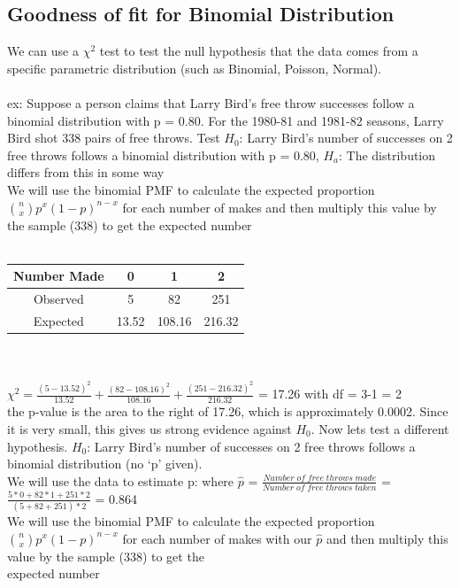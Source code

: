 \documentclass[12pt, a4paper]{article}
\begin{document}
	\subsection{Goodness of fit for Binomial Distribution}
	We can use a $\chi^2$ test to test the null hypothesis that the data comes from a specific parametric distribution (such as Binomial, Poisson, Normal). \\~\\
	ex: Suppose a person claims that Larry Bird's free throw successes follow a binomial distribution with p = 0.80. For the 1980-81 and 1981-82 seasons, Larry Bird shot 338 pairs of free throws. Test $H_0$: Larry Bird's number of successes on 2 free throws follows a binomial distribution with p = 0.80, $H_a$: The distribution differs from this in some way \\
	We will use the binomial PMF to calculate the expected proportion $\binom{n}{x}p^x(1-p)^{n-x}$ for each number of makes and then multiply this value by the sample (338) to get the expected number \\~\\
	\begin{tabular}{ |c|c|c|c| }
		\hline
		Number Made & 0 & 1 & 2 \\ \hline
		Observed & 5 & 82 & 251 \\
		Expected & 13.52 & 108.16 & 216.32 \\
		\hline
	\end{tabular} \\~\\
	$\chi^2 = \frac{(5-13.52)^2}{13.52} + \frac{(82-108.16)^2}{108.16} + \frac{(251-216.32)^2}{216.32}$ = 17.26  with df = 3-1 = 2\\ the p-value is the area to the right of 17.26, which is approximately 0.0002. Since it is very small, this gives us strong evidence against $H_0$. \newpage
	\noindent Now lets test a different hypothesis. $H_0$: Larry Bird's number of successes on 2 free throws follows a binomial distribution (no `p' given). \\
	We will use the data to estimate p: where $\hat{p}$ = $\frac{Number\; of\; free\; throws\; made}{Number\; of\; free\; throws\; taken}$ = $\frac{5*0 + 82*1 + 251*2}{(5+82+251)*2}$ = 0.864\\
	We will use the binomial PMF to calculate the expected proportion $\binom{n}{x}p^x(1-p)^{n-x}$ for each number of makes with our $\hat{p}$ and then multiply this value by the sample (338) to get the \\ expected number \\~\\
\end{document}

